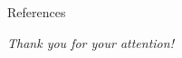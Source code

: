 \documentclass{beamer}
\begin{document}
\begin{frame}[allowframebreaks]{References}

\nocite{*}




\end{frame}

\begin{frame}

\begin{center}

\textit{ \LARGE Thank you for your attention!}
\end{center}

\end{frame}
\end{document}
